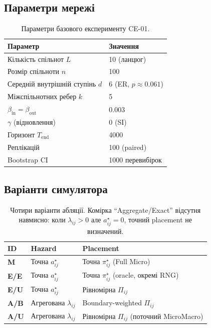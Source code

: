 \documentclass[11pt,a4paper]{article}
\begin{document}
\subsection{Параметри мережі}

\begin{table}[H]
\centering
\begin{tabular}{ll}
\toprule
Параметр & Значення \\
\midrule
Кількість спільнот $L$ & 10 (ланцюг) \\
Розмір спільноти $n$ & 100 \\
Середній внутрішній ступінь $d$ & 6 (ER, $p \approx 0.061$) \\
Міжспільнотних ребер $k$ & 5 \\
$\beta_{\mathrm{in}} = \beta_{\mathrm{out}}$ & 0.003 \\
$\gamma$ (відновлення) & 0 (SI) \\
Горизонт $T_{\mathrm{end}}$ & 4000 \\
Реплікацій & 100 (paired) \\
Bootstrap CI & 1000 перевибірок \\
\bottomrule
\end{tabular}
\caption{Параметри базового експерименту CE-01.}
\end{table}

\subsection{Варіанти симулятора}

\begin{table}[H]
\centering
\begin{tabular}{lll}
\toprule
ID & Hazard & Placement \\
\midrule
\textbf{M}   & Точна $a^{\star}_{ij}$ & Точна $\pi^{\star}_{ij}$ (Full Micro) \\
\textbf{E/E} & Точна $a^{\star}_{ij}$ & Точна $\pi^{\star}_{ij}$ (oracle, окремі RNG) \\
\textbf{E/U} & Точна $a^{\star}_{ij}$ & Рівномірна $\Pi_{ij}$ \\
\textbf{A/B} & Агрегована $\lambda_{ij}$ & Boundary-weighted $\Pi_{ij}$ \\
\textbf{A/U} & Агрегована $\lambda_{ij}$ & Рівномірна $\Pi_{ij}$ (поточний MicroMacro) \\
\bottomrule
\end{tabular}
\caption{Чотири варіанти абляції. Комірка ``Aggregate/Exact'' відсутня навмисно:
коли $\lambda_{ij}>0$ але $a^{\star}_{ij}=0$, точний placement не визначений.}
\end{table}
\end{document}
